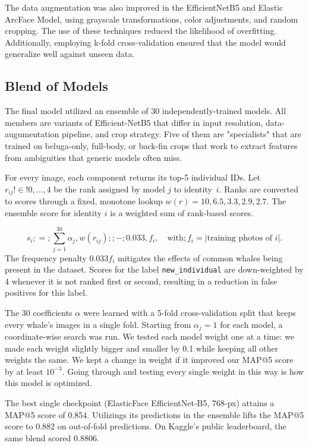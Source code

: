 \documentclass[twocolumn]{article}
\begin{document}
The data augmentation was also improved in the EfficientNetB5 and Elastic ArcFace Model, using grayscale transformations, color adjustments, and random cropping. The use of these techniques reduced the likelihood of overfitting. Additionally, employing k-fold cross-validation ensured that the model would generalize well against unseen data. 

\subsection{Blend of Models}

The final model utilized an ensemble of 30 independently-trained models. All members are variants of Efficient-NetB5 that differ in input resolution, data-augumentation pipeline, and crop strategy. Five of them are "specialists" that are trained on beluga-only, full-body, or back-fin crops that work to extract features from ambiguities that generic models often miss.

For every image, each component returns its top-5 individual IDs. Let $r_{ij}!\in!{0,\dots,4}$ be the rank assigned by model $j$ to identity~$i$. Ranks are converted to scores through a fixed, monotone lookup $w(r)={10,6.5,3.3,2.9,2.7}$. The ensemble score for identity $i$ is a weighted sum of rank-based scores.

\begin{equation}
s_i;=;\sum_{j=1}^{30} \alpha_j,w(r_{ij});;{-};0.033,f_i,\quad\text{with};f_i=|{\text{training photos of }i}|.
\end{equation}
The frequency penalty $0.033 f_i$ mitigates the effects of common whales being present in the dataset. Scores for the label \texttt{new_individual} are down-weighted by 4 whenever it is not ranked first or second, resulting in a reduction in false positives for this label. 

The 30 coefficients ${\alpha}$ were learned with a 5-fold cross-validation split that keeps every whale's images in a single fold. Starting from $\alpha_j = 1$ for each model, a coordinate-wise search was run. We tested each model weight one at a time: we made each weight slightly bigger and smaller by 0.1 while keeping all other weights the same. We kept a change in weight if it improved our MAP@5 score by at least $10^{-3}$. Going through and testing every single weight in this way is how this model is optimized.

The best single checkpoint (ElasticFace EfficientNet‑B5, 768‑px) attains a MAP@5 score of 0.854. Utilizings its predictions in the ensemble lifts the MAP@5 score to 0.882 on  out-of-fold predictions. On Kaggle's public leaderboard, the same blend scored 0.8806.
\end{document}
